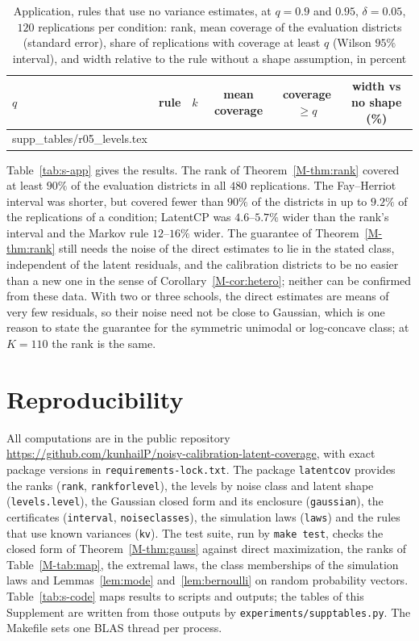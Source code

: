 \documentclass[12pt]{article}
\makeatletter
\newcommand{\tabinput}[1]{\@@input #1 }
\renewcommand{\_}{\usc\allowbreak}
\theoremstyle{definition}
\numberwithin{equation}{section}
\makeatother
\begin{document}
\begin{table}[htbp]
\renewcommand{\baselinestretch}{1}
\caption{Application, rules that use no variance estimates, at $q = 0.9$ and $0.95$, $\delta = 0.05$, $120$ replications per condition: rank, mean coverage of the evaluation districts (standard error), share of replications with coverage at least $q$ (Wilson $95\%$ interval), and width relative to the rule without a shape assumption, in percent}
\label{tab:s-app-levels}
\centering
\fontsize{7.5}{9pt}\selectfont
\begin{tabular}{llcccc}
\toprule
$q$ & rule & $k$ & mean coverage & coverage $\ge q$ & width vs no shape (\%) \\
\midrule
\tabinput{supp_tables/r05_levels.tex}
\bottomrule
\end{tabular}
\end{table}

Table~\ref{tab:s-app} gives the results. The rank of Theorem~\ref{M-thm:rank} covered at least $90\%$ of the evaluation districts in all $480$ replications. The Fay--Herriot interval was shorter, but covered fewer than $90\%$ of the districts in up to $9.2\%$ of the replications of a condition; LatentCP was $4.6$--$5.7\%$ wider than the rank's interval and the Markov rule $12$--$16\%$ wider. The guarantee of Theorem~\ref{M-thm:rank} still needs the noise of the direct estimates to lie in the stated class, independent of the latent residuals, and the calibration districts to be no easier than a new one in the sense of Corollary~\ref{M-cor:hetero}; neither can be confirmed from these data. With two or three schools, the direct estimates are means of very few residuals, so their noise need not be close to Gaussian, which is one reason to state the guarantee for the symmetric unimodal or log-concave class; at $K = 110$ the rank is the same.

\section{Reproducibility}\label{sec:s-code}

All computations are in the public repository \url{https://github.com/kunhailP/noisy-calibration-latent-coverage}, with exact package versions in \texttt{requirements-lock.txt}. The package \texttt{latentcov} provides the ranks (\texttt{rank}, \texttt{rank\_for\_level}), the levels by noise class and latent shape (\texttt{levels.level}), the Gaussian closed form and its enclosure (\texttt{gaussian}), the certificates (\texttt{interval}, \texttt{noise\_classes}), the simulation laws (\texttt{laws}) and the rules that use known variances (\texttt{kv}). The test suite, run by \texttt{make test}, checks the closed form of Theorem~\ref{M-thm:gauss} against direct maximization, the ranks of Table~\ref{M-tab:map}, the extremal laws, the class memberships of the simulation laws and Lemmas~\ref{lem:mode} and~\ref{lem:bernoulli} on random probability vectors. Table~\ref{tab:s-code} maps results to scripts and outputs; the tables of this Supplement are written from those outputs by \texttt{experiments/supp\_tables.py}. The Makefile sets one BLAS thread per process.
\end{document}
